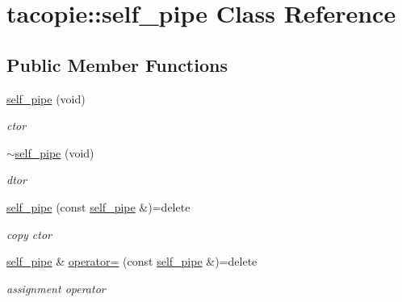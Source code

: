 \hypertarget{classtacopie_1_1self__pipe}{}\section{tacopie\+:\+:self\+\_\+pipe Class Reference}
\label{classtacopie_1_1self__pipe}
\subsection*{Public Member Functions}
\begin{DoxyCompactItemize}
\item 
\mbox{\label{classtacopie_1_1self__pipe_add8d2c43863d1505e6851789ab5d9b97}} 
\hyperlink{classtacopie_1_1self__pipe_add8d2c43863d1505e6851789ab5d9b97}{self\+\_\+pipe} (void)
\begin{DoxyCompactList}\small\item\em ctor \end{DoxyCompactList}\item 
\mbox{\label{classtacopie_1_1self__pipe_a10a6c4b0d67a4a14abea397a05cee54c}} 
\hyperlink{classtacopie_1_1self__pipe_a10a6c4b0d67a4a14abea397a05cee54c}{$\sim$self\+\_\+pipe} (void)
\begin{DoxyCompactList}\small\item\em dtor \end{DoxyCompactList}\item 
\mbox{\label{classtacopie_1_1self__pipe_a09ffc77b89ad48bc8db6635108c68b6b}} 
\hyperlink{classtacopie_1_1self__pipe_a09ffc77b89ad48bc8db6635108c68b6b}{self\+\_\+pipe} (const \hyperlink{classtacopie_1_1self__pipe}{self\+\_\+pipe} \&)=delete
\begin{DoxyCompactList}\small\item\em copy ctor \end{DoxyCompactList}\item 
\mbox{\label{classtacopie_1_1self__pipe_a14e0fa3a880b6c9559c087eac480c518}} 
\hyperlink{classtacopie_1_1self__pipe}{self\+\_\+pipe} \& \hyperlink{classtacopie_1_1self__pipe_a14e0fa3a880b6c9559c087eac480c518}{operator=} (const \hyperlink{classtacopie_1_1self__pipe}{self\+\_\+pipe} \&)=delete
\begin{DoxyCompactList}\small\item\em assignment operator \end{DoxyCompactList}\item 

\end{DoxyCompactItemize}
